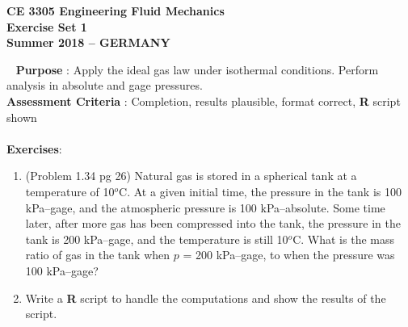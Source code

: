 \documentclass[12pt]{article}
\begin{document}
\begingroup
\begin{center}
{\textbf{{ CE 3305 Engineering Fluid Mechanics} \\ Exercise Set 1 \\ Summer 2018 -- GERMANY} }
\end{center}
\endgroup
\begingroup
~\newline
\textbf{Purpose} : Apply the ideal gas law under isothermal conditions.  Perform analysis in absolute and gage pressures. \\
\textbf{Assessment Criteria} : Completion, results plausible, format correct, \textbf{R} script shown\\~\\
\textbf{Exercises}:

\begin{enumerate}
\item (Problem 1.34 pg 26)
Natural gas is stored in a spherical tank at a temperature of 10$^o$C.  
At a given initial time, the pressure in the tank is 100 kPa--gage, and the atmospheric pressure is 100 kPa--absolute.  
Some time later, after more gas has been compressed into the tank, the pressure in the tank is 200 kPa--gage, and the temperature is still 10$^o$C.
What is the mass ratio of gas in the tank when $p$ =  200 kPa--gage, to when the pressure was 100 kPa--gage?
\item Write a \textbf{R} script to handle the computations and show the results of the script.
\end{enumerate}
\end{document}
